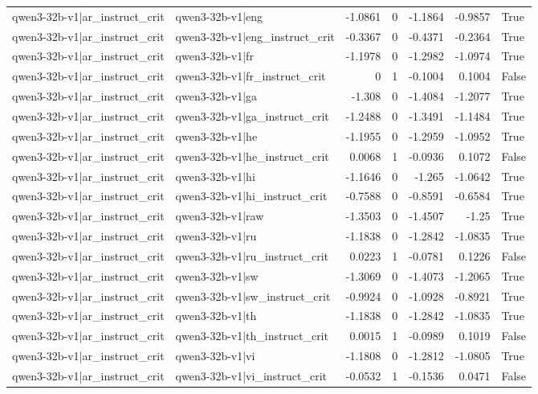 \begin{table}
\begin{tabular}{l l r r r r l}
qwen3-32b-v1|ar_instruct_crit & qwen3-32b-v1|eng & -1.0861 & 0 & -1.1864 & -0.9857 & True \\
qwen3-32b-v1|ar_instruct_crit & qwen3-32b-v1|eng_instruct_crit & -0.3367 & 0 & -0.4371 & -0.2364 & True \\
qwen3-32b-v1|ar_instruct_crit & qwen3-32b-v1|fr & -1.1978 & 0 & -1.2982 & -1.0974 & True \\
qwen3-32b-v1|ar_instruct_crit & qwen3-32b-v1|fr_instruct_crit & 0 & 1 & -0.1004 & 0.1004 & False \\
qwen3-32b-v1|ar_instruct_crit & qwen3-32b-v1|ga & -1.308 & 0 & -1.4084 & -1.2077 & True \\
qwen3-32b-v1|ar_instruct_crit & qwen3-32b-v1|ga_instruct_crit & -1.2488 & 0 & -1.3491 & -1.1484 & True \\
qwen3-32b-v1|ar_instruct_crit & qwen3-32b-v1|he & -1.1955 & 0 & -1.2959 & -1.0952 & True \\
qwen3-32b-v1|ar_instruct_crit & qwen3-32b-v1|he_instruct_crit & 0.0068 & 1 & -0.0936 & 0.1072 & False \\
qwen3-32b-v1|ar_instruct_crit & qwen3-32b-v1|hi & -1.1646 & 0 & -1.265 & -1.0642 & True \\
qwen3-32b-v1|ar_instruct_crit & qwen3-32b-v1|hi_instruct_crit & -0.7588 & 0 & -0.8591 & -0.6584 & True \\
qwen3-32b-v1|ar_instruct_crit & qwen3-32b-v1|raw & -1.3503 & 0 & -1.4507 & -1.25 & True \\
qwen3-32b-v1|ar_instruct_crit & qwen3-32b-v1|ru & -1.1838 & 0 & -1.2842 & -1.0835 & True \\
qwen3-32b-v1|ar_instruct_crit & qwen3-32b-v1|ru_instruct_crit & 0.0223 & 1 & -0.0781 & 0.1226 & False \\
qwen3-32b-v1|ar_instruct_crit & qwen3-32b-v1|sw & -1.3069 & 0 & -1.4073 & -1.2065 & True \\
qwen3-32b-v1|ar_instruct_crit & qwen3-32b-v1|sw_instruct_crit & -0.9924 & 0 & -1.0928 & -0.8921 & True \\
qwen3-32b-v1|ar_instruct_crit & qwen3-32b-v1|th & -1.1838 & 0 & -1.2842 & -1.0835 & True \\
qwen3-32b-v1|ar_instruct_crit & qwen3-32b-v1|th_instruct_crit & 0.0015 & 1 & -0.0989 & 0.1019 & False \\
qwen3-32b-v1|ar_instruct_crit & qwen3-32b-v1|vi & -1.1808 & 0 & -1.2812 & -1.0805 & True \\
qwen3-32b-v1|ar_instruct_crit & qwen3-32b-v1|vi_instruct_crit & -0.0532 & 1 & -0.1536 & 0.0471 & False \\

\end{tabular}
\end{table}

